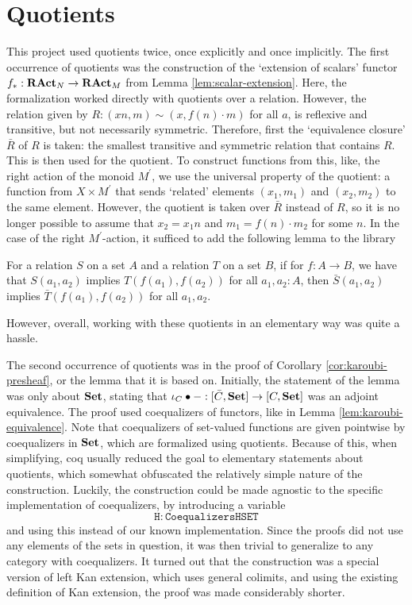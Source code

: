 \section{Quotients}
This project used quotients twice, once explicitly and once implicitly. The first occurrence of quotients was the construction of the `extension of scalars' functor $ f_*: \mathbf{RAct}_{N} \to \mathbf{RAct}_{M} $ from Lemma \ref{lem:scalar-extension}. Here, the formalization worked directly with quotients over a relation. However, the relation given by $ R : (x n, m) \sim (x, f(n) \cdot m) $ for all $ a $, is reflexive and transitive, but not necessarily symmetric. Therefore, first the `equivalence closure' $ \bar R $ of $ R $ is taken: the smallest transitive and symmetric relation that contains $ R $. This is then used for the quotient. To construct functions from this, like, the right action of the monoid $ M^\prime $, we use the universal property of the quotient: a function from $ X \times M^\prime $ that sends `related' elements $ (x_1, m_1) $ and $ (x_2, m_2) $ to the same element. However, the quotient is taken over $ \bar R $ instead of $ R $, so it is no longer possible to assume that $ x_2 = x_1 n $ and $ m_1 = f(n) \cdot m_2 $ for some $ n $. In the case of the right $ M^\prime $-action, it sufficed to add the following lemma to the library
\begin{lemma}
  For a relation $ S $ on a set $ A $ and a relation $ T $ on a set $ B $, if for $ f: A \to B $, we have that $ S(a_1, a_2) $ implies $ T(f(a_1), f(a_2)) $ for all $ a_1, a_2 : A $, then $ \bar S(a_1, a_2) $ implies $ \bar T(f(a_1), f(a_2)) $ for all $ a_1, a_2 $.
\end{lemma}
However, overall, working with these quotients in an elementary way was quite a hassle.

The second occurrence of quotients was in the proof of Corollary \ref{cor:karoubi-presheaf}, or the lemma that it is based on. Initially, the statement of the lemma was only about $ \mathbf{Set} $, stating that $ \iota_C \bullet - : [\bar C, \mathbf{Set}] \to [C, \mathbf{Set}] $ was an adjoint equivalence. The proof used coequalizers of functors, like in Lemma \ref{lem:karoubi-equivalence}. Note that coequalizers of set-valued functions are given pointwise by coequalizers in $ \mathbf{Set} $, which are formalized using quotients. Because of this, when simplifying, coq usually reduced the goal to elementary statements about quotients, which somewhat obfuscated the relatively simple nature of the construction. Luckily, the construction could be made agnostic to the specific implementation of coequalizers, by introducing a variable
\[ \mathtt{H : Coequalizers HSET} \]
and using this instead of our known implementation. Since the proofs did not use any elements of the sets in question, it was then trivial to generalize to any category with coequalizers. It turned out that the construction was a special version of left Kan extension, which uses general colimits, and using the existing definition of Kan extension, the proof was made considerably shorter.


